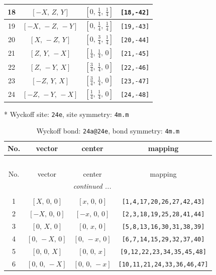 \documentclass[fleqn,8pt]{jsarticle}
\begin{document}
\begin{longtable}{cccc}
18 & $\left[ - X,\, Z,\, Y \right]$ & $\left[ 0,\, \frac{1}{4},\, \frac{1}{4} \right]$ & {\tt [18,-42]} \\ \hline
19 & $\left[ - X,\, - Z,\, - Y \right]$ & $\left[ 0,\, \frac{1}{4},\, \frac{1}{4} \right]$ & {\tt [19,-43]} \\ \hline
20 & $\left[ X,\, - Z,\, Y \right]$ & $\left[ 0,\, \frac{3}{4},\, \frac{1}{4} \right]$ & {\tt [20,-44]} \\ \hline
21 & $\left[ Z,\, Y,\, - X \right]$ & $\left[ \frac{1}{4},\, \frac{1}{4},\, 0 \right]$ & {\tt [21,-45]} \\ \hline
22 & $\left[ Z,\, - Y,\, X \right]$ & $\left[ \frac{3}{4},\, \frac{1}{4},\, 0 \right]$ & {\tt [22,-46]} \\ \hline
23 & $\left[ - Z,\, Y,\, X \right]$ & $\left[ \frac{3}{4},\, \frac{1}{4},\, 0 \right]$ & {\tt [23,-47]} \\ \hline
24 & $\left[ - Z,\, - Y,\, - X \right]$ & $\left[ \frac{1}{4},\, \frac{1}{4},\, 0 \right]$ & {\tt [24,-48]} \\
\end{longtable}
* Wyckoff site: {\tt 24e}, site symmetry: {\tt 4m.m}
\renewcommand{\arraystretch}{1.2}
\begin{longtable}{cccc}
\caption{Wyckoff bond: {\tt 24a@24e}, bond symmetry: {\tt 4m.m}}
 \\
 \hline \hline
No. & vector & center & mapping \\ \hline \endfirsthead

\multicolumn{3}{l}{\tablename\ \thetable{}} \\
 \hline \hline
No. & vector & center & mapping \\ \hline \endhead

 \hline \hline
\multicolumn{3}{r}{\footnotesize\it continued ...} \\ \endfoot

 \hline \hline
\multicolumn{3}{r}{} \\ \endlastfoot

1 & $\left[ X,\, 0,\, 0 \right]$ & $\left[ x,\, 0,\, 0 \right]$ & {\tt [1,4,17,20,26,27,42,43]} \\ \hline
2 & $\left[ - X,\, 0,\, 0 \right]$ & $\left[ - x,\, 0,\, 0 \right]$ & {\tt [2,3,18,19,25,28,41,44]} \\ \hline
3 & $\left[ 0,\, X,\, 0 \right]$ & $\left[ 0,\, x,\, 0 \right]$ & {\tt [5,8,13,16,30,31,38,39]} \\ \hline
4 & $\left[ 0,\, - X,\, 0 \right]$ & $\left[ 0,\, - x,\, 0 \right]$ & {\tt [6,7,14,15,29,32,37,40]} \\ \hline
5 & $\left[ 0,\, 0,\, X \right]$ & $\left[ 0,\, 0,\, x \right]$ & {\tt [9,12,22,23,34,35,45,48]} \\ \hline
6 & $\left[ 0,\, 0,\, - X \right]$ & $\left[ 0,\, 0,\, - x \right]$ & {\tt [10,11,21,24,33,36,46,47]} \\
\end{longtable}
\end{document}

